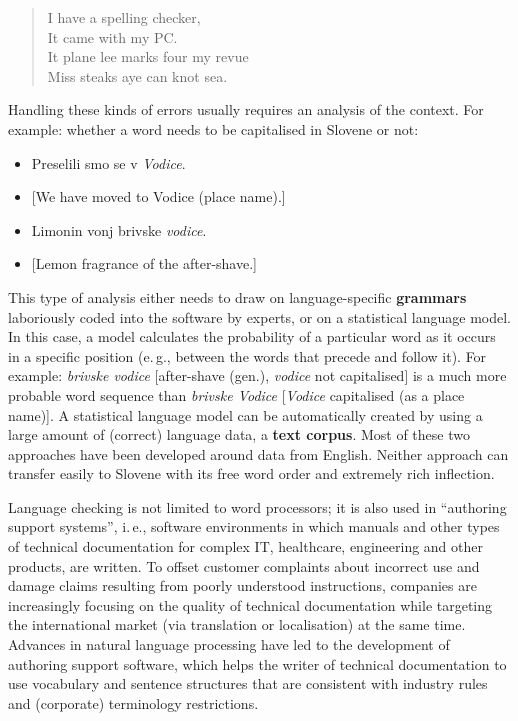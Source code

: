 \begin{multicols}{2}
\begin{quote}
  I have a spelling checker,\\
  It came with my PC.\\
  It plane lee marks four my revue\\
  Miss steaks aye can knot sea.
\end{quote}

Handling these kinds of errors usually requires an analysis of the context. For example: whether a word needs to be capitalised in Slovene or not:

\begin{itemize}
\item Preselili smo se v \textit{Vodice}.
\item {[}We have moved to Vodice (place name).{]} 
\item Limonin vonj brivske \textit{vodice}.
\item {[}Lemon fragrance of the after-shave.{]} 
\end{itemize}

This type of analysis either needs to draw on language-specific \textbf{grammars} laboriously coded into the software by experts, or on a statistical language model. In this case, a model calculates the probability of a particular word as it occurs in a specific position (e.\,g., between the words that precede and follow it). For example: \textit{brivske vodice} [after-shave (gen.), \textit{vodice} not capitalised] is a much more probable word sequence than \textit{brivske Vodice} [\textit{Vodice} capitalised (as a place name)]. A statistical language model can be automatically created by using a large amount of (correct) language data, a \textbf{text corpus}. Most of these two approaches have been developed around data from English. Neither approach can transfer easily to Slovene with its free word order and extremely rich inflection.

Language checking is not limited to word processors; it is also used in “authoring support systems”, i.\,e., software environments in which manuals and other types of technical documentation for complex IT, healthcare, engineering and other products, are written. To offset customer complaints about incorrect use and damage claims resulting from poorly understood instructions, companies are increasingly focusing on the quality of technical documentation while targeting the international market (via translation or localisation) at the same time. Advances in natural language processing have led to the development of authoring support software, which helps the writer of technical documentation to use vocabulary and sentence structures that are consistent with industry rules and (corporate) terminology restrictions.


\end{multicols}
